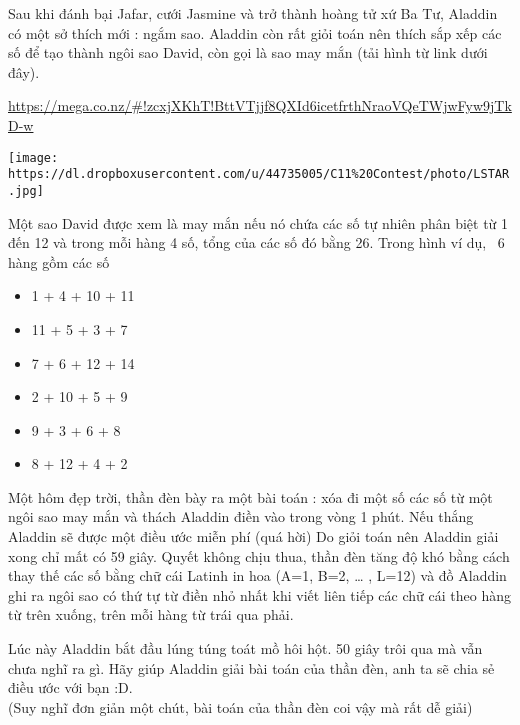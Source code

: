 Sau khi đánh bại Jafar, cưới Jasmine và trở thành hoàng tử xứ Ba Tư, Aladdin có một sở thích mới : ngắm sao. Aladdin còn rất giỏi toán nên thích sắp xếp các số để tạo thành ngôi sao David, còn gọi là sao may mắn (tải hình từ link dưới đây).  

\href{https://mega.co.nz/#!zcxjXKhT!BttVTjjf8QXId6icetfrthNraoVQeTWjwFyw9jTkD-w}{    https://mega.co.nz/\#!zcxjXKhT!BttVTjjf8QXId6icetfrthNraoVQeTWjwFyw9jTkD-w   }


\texttt{[image: https://dl.dropboxusercontent.com/u/44735005/C11\%20Contest/photo/LSTAR.jpg]}

   Một sao David được xem là may mắn nếu nó chứa các số tự nhiên phân biệt từ 1 đến 12 và trong mỗi hàng 4 số, tổng của các số đó bằng 26. Trong hình ví dụ,  6 hàng gồm các số  
\begin{itemize}
	\item     1 + 4 + 10 + 11   
	\item     11 + 5 + 3 + 7   
	\item     7 + 6 + 12 + 14   
	\item     2 + 10 + 5 + 9   
	\item     9 + 3 + 6 + 8   
	\item     8 + 12 + 4 + 2   
\end{itemize}

   Một hôm đẹp trời, thần đèn bày ra một bài toán : xóa đi một số các số từ một ngôi sao may mắn và thách Aladdin điền vào trong vòng 1 phút. Nếu thắng Aladdin sẽ được một điều ước miễn phí (quá hời) Do giỏi toán nên Aladdin giải xong chỉ mất có 59 giây. Quyết không chịu thua, thần đèn tăng độ khó bằng cách thay thế các số bằng chữ cái Latinh in hoa (A=1, B=2, … , L=12) và đồ Aladdin ghi ra ngôi sao có thứ tự từ điền nhỏ nhất khi viết liên tiếp các chữ cái theo hàng từ trên xuống, trên mỗi hàng từ trái qua phải.  

   Lúc này Aladdin bắt đầu lúng túng toát mồ hôi hột. 50 giây trôi qua mà vẫn chưa nghĩ ra gì. Hãy giúp Aladdin giải bài toán của thần đèn, anh ta sẽ chia sẻ điều ước với bạn :D.   
\\   (Suy nghĩ đơn giản một chút, bài toán của thần đèn coi vậy mà rất dễ giải)  

\
